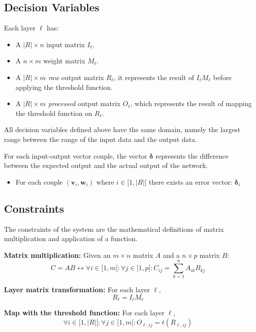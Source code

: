 \documentclass[a4paper, 10pt]{article}
\begin{document}
\subsection*{Decision Variables}
Each layer $\ell$ has: 
\begin{itemize}
    \item A $|R| \times n$ input matrix $I_\ell$.
    \item A $n \times m$  weight matrix $M_\ell$. 
    \item A $|R| \times m$ \emph{raw} output matrix $R_\ell$, it represents the
        result of $I_\ell M_\ell$ before applying the threshold function.
    \item A $|R| \times m$ \emph{processed} output matrix $O_\ell$, which represents the
        result of mapping the threshold function on $R_\ell$.
\end{itemize}

All decision variables defined above have the same domain, namely the
largest range between the range of the input data and the output data.

For each input-output vector couple, the vector $\boldsymbol{\delta}$ 
represents the difference between the expected output and the actual output of the network.
\begin{itemize}
    \item For each couple $(\mathbf{v}_i, \mathbf{w}_i)$ where $i \in [1, |R|[$ 
        there exists an error vector: $\boldsymbol{\delta}_i$
\end{itemize}

\subsection*{Constraints}
The constraints of the system are the mathematical definitions of matrix
multiplication and application of a function.

\begin{description}
    \item{\textbf{Matrix multiplication:}} Given an $m \times n$ matrix $A$ and a $n
        \times p$ matrix $B$: 
        \begin{equation*}
            C = AB \leftrightarrow 
            \forall i \in [1, m[: \forall j \in [1, p[: C_{ij} = \sum_{k = 1}^{n}A_{ik}B_{kj}
        \end{equation*}
    \item{\textbf{Layer matrix transformation:}} For each layer $\ell$,
        \begin{equation*}
            R_\ell = I_\ell M_\ell
        \end{equation*}

    \item{\textbf{Map with the threshold function:}} For each layer $\ell$,
        \begin{equation*}
            \forall i \in [1, |R|[: 
            \forall j \in [1, m[:
                    O_{\ell, ij} = t(R_{\ell, ij})
        \end{equation*}
\end{description}
\end{document}
